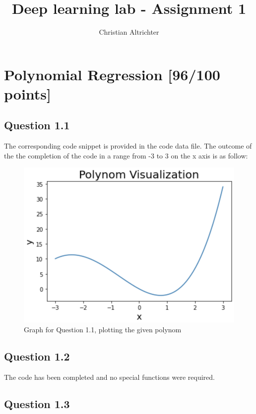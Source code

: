 \documentclass{article}
\title{Deep learning lab - Assignment 1}
\author{Christian Altrichter}
\begin{document}
\maketitle


\section{Polynomial Regression [96/100 points]}

\subsection{Question 1.1}

The corresponding code snippet is provided in the code data file. The outcome of the the completion of the code in a range from -3 to 3 on the x axis is as follow:

\begin{figure}[!htb]
\centering
\includegraphics[scale = 0.8]{Question1_Graph.png}
\caption{\label{fig:fig}Graph for Question 1.1, plotting the given polynom}
\end{figure}

\subsection{Question 1.2}

The code has been completed and no special functions were required.

\subsection{Question 1.3}
\end{document}
